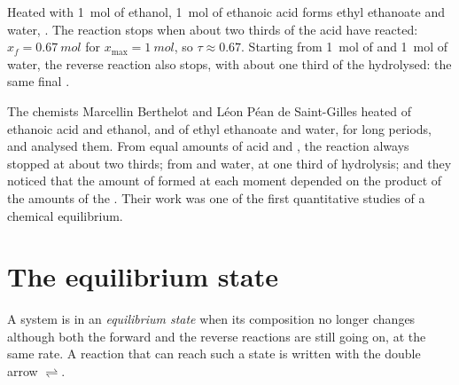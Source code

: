 \begin{example}\label{ex:g12:equilibrium:berthelot}
Heated with \qty{1}{mol} of ethanol, \qty{1}{mol} of ethanoic acid forms
ethyl ethanoate and water,
. The reaction stops when about
two thirds of the acid have reacted: $x_f = \qty{0.67}{mol}$ for
$x_{\max} = \qty{1}{mol}$, so $\tau \approx 0.67$. Starting from
\qty{1}{mol} of  and \qty{1}{mol} of water, the reverse reaction
also stops, with about one third of the  hydrolysed: the same final
.
\end{example}

\begin{history}
The chemists Marcellin Berthelot and Léon Péan de Saint-Gilles heated
 of ethanoic acid and ethanol, and of ethyl ethanoate and water,
for long periods, and analysed them. From equal amounts of acid and
, the reaction always stopped at about two thirds; from  and
water, at one third of hydrolysis; and they noticed that the amount of
 formed at each moment depended on the product of the amounts of
the . Their work was one of the first quantitative studies of a
chemical equilibrium.
\end{history}

\section{The equilibrium state}

\begin{definition}\label{def:g12:equilibrium:equilibrium-state}
A system is in an \emph{equilibrium state} when
its composition no longer changes although both the forward and the
reverse reactions are still going on, at the same rate. A reaction that
can reach such a state is written with the double arrow $\rightleftharpoons$.
\end{definition}

